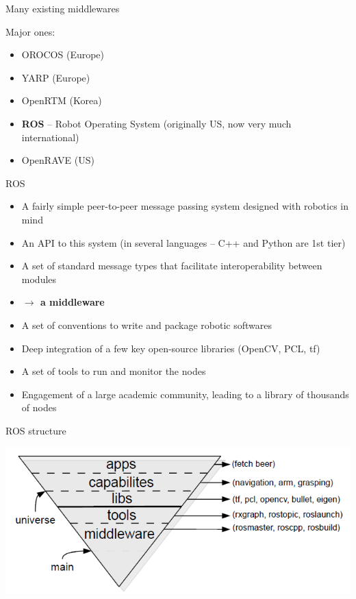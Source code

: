 \documentclass[compress]{beamer}
\begin{document}
\begin{frame}{Many existing middlewares}

    Major ones:

    \begin{itemize}
        \item OROCOS (Europe)
        \item YARP (Europe)
        \item OpenRTM (Korea)
        \item \textbf<2>{ROS} -- Robot Operating System (originally US, now very much international)
        \item OpenRAVE (US)
    \end{itemize}
\end{frame}


\begin{frame}{ROS}
    \begin{itemize}
        \item<1-> A fairly simple peer-to-peer message passing system designed with robotics in
            mind
        \item<2-> An API to this system (in several languages -- C++ and Python are
            1st tier)
        \item<3-> A set of standard message types that facilitate interoperability between modules
        \item<4> \bf{$\rightarrow$ a middleware}
        \item<5-> A set of conventions to write and package robotic softwares
        \item<6-> Deep integration of a few key open-source libraries (OpenCV, PCL, tf)
        \item<7-> A set of tools to run and monitor the nodes
        \item<8-> Engagement of a large academic community, leading to a library of thousands of nodes
    \end{itemize}
\end{frame}

\begin{frame}{ROS structure}

    \begin{center}
        \includegraphics[width=\linewidth]{ros_structure}
    \end{center}
\end{frame}
\end{document}
